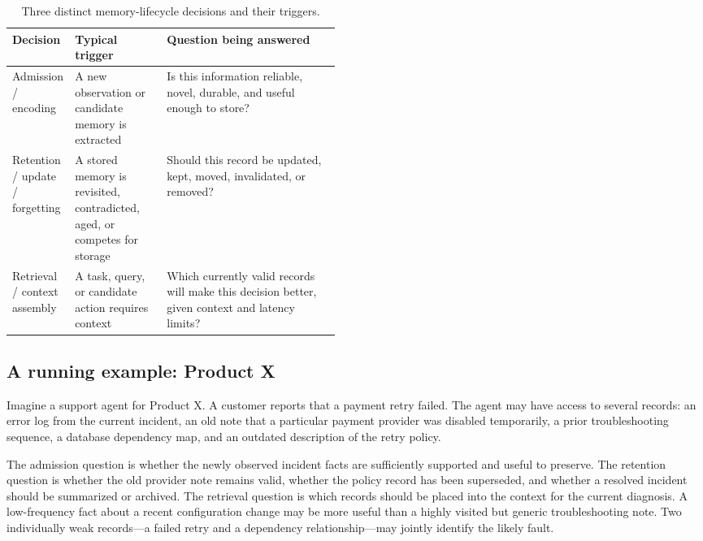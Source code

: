 \begin{table}[tbp]
\centering
\small
\caption{Three distinct memory-lifecycle decisions and their triggers.}
\label{tab:ch12-lifecycle-decisions}
\begin{tabularx}{\linewidth}{@{}p{0.18\linewidth}p{0.29\linewidth}X@{}}
\toprule
\textbf{Decision} & \textbf{Typical trigger} & \textbf{Question being answered} \\
\midrule
Admission / encoding & A new observation or candidate memory is extracted & Is this information reliable, novel, durable, and useful enough to store? \\
Retention / update / forgetting & A stored memory is revisited, contradicted, aged, or competes for storage & Should this record be updated, kept, moved, invalidated, or removed? \\
Retrieval / context assembly & A task, query, or candidate action requires context & Which currently valid records will make this decision better, given context and latency limits? \\
\bottomrule
\end{tabularx}
\end{table}


\subsection{A running example: Product X}
\label{subsec:ch12-productx}

\BookExampleLabel{} Imagine a support agent for Product X. A customer reports that a payment retry failed. The agent may have access to several records: an error log from the current incident, an old note that a particular payment provider was disabled temporarily, a prior troubleshooting sequence, a database dependency map, and an outdated description of the retry policy.

The admission question is whether the newly observed incident facts are sufficiently supported and useful to preserve. The retention question is whether the old provider note remains valid, whether the policy record has been superseded, and whether a resolved incident should be summarized or archived. The retrieval question is which records should be placed into the context for the current diagnosis. A low-frequency fact about a recent configuration change may be more useful than a highly visited but generic troubleshooting note. Two individually weak records—a failed retry and a dependency relationship—may jointly identify the likely fault.

